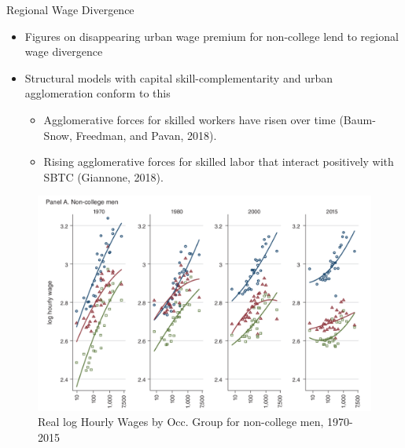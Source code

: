 \documentclass{beamer}
\begin{document}
\begin{frame}{Regional Wage Divergence}

\begin{itemize}
	
	\item Figures on disappearing urban wage premium for non-college lend to regional wage divergence
	
	\bigskip
	
	\item Structural models with capital skill-complementarity and urban agglomeration conform to this
	\begin{itemize}
		\item Agglomerative forces for skilled workers have risen over time (Baum-Snow, Freedman, and Pavan, 2018).
		\item Rising agglomerative forces for skilled labor that interact positively with SBTC (Giannone, 2018).
	\end{itemize}

\end{itemize}
	
	\begin{figure}
		\begin{center}
			\includegraphics[scale=0.2]{Figures/Fig10_WageDivergence_Skill}
			\caption{Real log Hourly Wages by Occ. Group for non-college men, 1970-2015}
		\end{center}
	\end{figure}


\end{frame}
\end{document}
